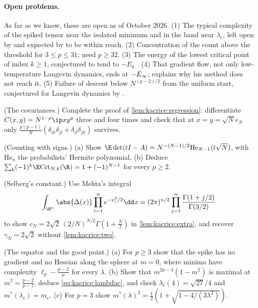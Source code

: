 \begin{refsection}
\paragraph{Open problems.} As far as we know, these are open as of October 2026. (1) The typical complexity of the spiked tensor near the isolated minimum and in the band near $\lambda_c$, left open by \textcite{BenArousMeiMontanariNica2019} and expected by \textcite{RosEtAl2019} to be within reach. (2) Concentration of the count above the threshold for $3\le p\le31$; \textcite{SubagZeitouni2021} need $p\ge32$. (3) The energy of the lowest critical point of index $k\ge1$, conjectured to tend to $-E_k$ \parencite[Remark~2.16]{AuffingerBenArousCerny2013}. (4) That gradient flow, not only low-temperature Langevin dynamics, ends at $-E_\infty$; \textcite[Remark~1.5]{Sellke2024} explains why his method does not reach it. (5) Failure of descent below $N^{(p-2)/2}$ from the uniform start, conjectured for Langevin dynamics by \textcite[Sections~1 and~2.4]{BenArousGheissariJagannath2020}.

\begin{exercises}
\item \consolidation (The covariances.) Complete the proof of \cref{lem:kacrice:regression}: differentiate $C(x,y)=N^{1-p}\ip xy^p$ three and four times and check that at $x=y=\sqrt Ne_N$ only $\frac{p(p-1)}N(\delta_{ik}\delta_{jl}+\delta_{il}\delta_{jk})$ survives.\label{ex:kacrice:cov}

\item \consolidation (Counting with signs.) (a) Show $\E\det(tI-A)=N^{-(N-1)/2}\mathrm{He}_{N-1}(t\sqrt N)$, with $\mathrm{He}_n$ the probabilists' Hermite polynomial. (b) Deduce $\sum_k(-1)^k\E\kacriceCrt_{N,k}(\R)=1+(-1)^{N-1}$ for every $p\ge2$. \label{ex:kacrice:euler}

\item \byhand (Selberg's constant.) Use Mehta's integral
\[
\int_{\R^n}\abs{\Delta(x)}\prod_{i=1}^ne^{-x_i^2/2}\dd x=(2\pi)^{n/2}\prod_{j=1}^n\frac{\Gamma(1+j/2)}{\Gamma(3/2)}
\]
to show $c_N=2\sqrt2\,(2/N)^{N/2}\Gamma(1+\frac N2)$ in \cref{lem:kacrice:extra}, and recover $\gamma_N=2\sqrt2$ without \cref{lem:kacrice:two}.\label{ex:kacrice:mehta}

\item \byhand (The equator and the good point.) (a) For $p\ge3$ show that the spike has no gradient and no Hessian along the sphere at $m=0$, where minima have complexity $\ell_p-\frac{p-2}p$ for every $\lambda$. (b) Show that $m^{2p-4}(1-m^2)$ is maximal at $m^2=\frac{p-2}{p-1}$, deduce \eqref{eq:kacrice:lambdac}, and check $\lambda_c(4)=\sqrt{27}/4$ and $m^*(\lambda_c)=m_c$. (c) For $p=3$ show $m^*(\lambda)^2=\frac12(1+\sqrt{1-4/(3\lambda^2)})$.\label{ex:kacrice:mstar}


\end{exercises}
\end{refsection}
